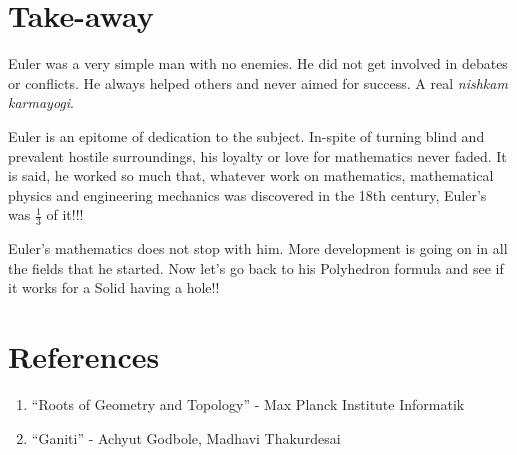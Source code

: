 \documentclass[12pt]{article}
\begin{document}
\section*{Take-away}
Euler was a very simple man with no enemies. He did not get involved in debates or conflicts. He always helped others and never aimed for success. A real {\em nishkam karmayogi}.

Euler is an epitome of dedication to the subject. In-spite of turning blind and prevalent hostile surroundings, his loyalty or love for mathematics never faded. It is said, he worked so much that, whatever work on mathematics, mathematical  physics and engineering mechanics was discovered in the 18th century, Euler's was $\frac{1}{3}$ of it!!!

Euler's mathematics does not stop with him. More development is going on in all the fields that he started. Now let's go back to his Polyhedron formula and see if it works for a Solid having a hole!!



\section*{References}
\begin{enumerate}
\item ``Roots of Geometry and Topology'' - Max Planck Institute Informatik
\item ``Ganiti'' - Achyut Godbole, Madhavi Thakurdesai
\end{enumerate}
\end{document}
